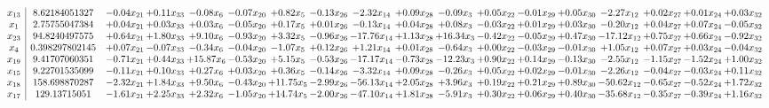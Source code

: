 \documentclass[9pt]{article}
\begin{document}
 \[\begin{array}{c| c c@{\hskip 2pt} c@{\hskip 2pt} c@{\hskip 2pt} c@{\hskip 2pt} c@{\hskip 2pt} c@{\hskip 2pt} c@{\hskip 2pt} c@{\hskip 2pt} c@{\hskip 2pt} c@{\hskip 2pt} c@{\hskip 2pt} c@{\hskip 2pt} c@{\hskip 2pt} c@{\hskip 2pt} c@{\hskip 2pt} c@{\hskip 2pt} }
 x_{13}   &  8.62184051327 & -0.04 x_{21} & +  0.11 x_{33} & -0.08 x_{6} & -0.07 x_{20} & +  0.82 x_{5} & -0.13 x_{26} & -2.32 x_{14} & +  0.09 x_{28} & -0.09 x_{3} & +  0.05 x_{22} & -0.01 x_{29} & +  0.05 x_{30} & -2.27 x_{12} & +  0.02 x_{27} & +  0.01 x_{24} & +  0.03 x_{32}\\
 x_{1}   &  2.75755047384 & +  0.04 x_{21} & +  0.03 x_{33} & +  0.03 x_{6} & -0.05 x_{20} & +  0.17 x_{5} & +  0.01 x_{26} & -0.13 x_{14} & +  0.04 x_{28} & +  0.08 x_{3} & -0.03 x_{22} & +  0.01 x_{29} & +  0.03 x_{30} & -0.20 x_{12} & +  0.04 x_{27} & +  0.07 x_{24} & -0.05 x_{32}\\
 x_{23}   &  94.8240497575 & +  0.64 x_{21} & +  1.80 x_{33} & +  9.10 x_{6} & -0.93 x_{20} & +  3.32 x_{5} & -0.96 x_{26} & -17.76 x_{14} & +  1.13 x_{28} & + 16.34 x_{3} & -0.42 x_{22} & -0.05 x_{29} & +  0.47 x_{30} & -17.12 x_{12} & +  0.75 x_{27} & +  0.66 x_{24} & -0.92 x_{32}\\
 x_{4}   &  0.398297802145 & +  0.07 x_{21} & -0.07 x_{33} & -0.34 x_{6} & -0.04 x_{20} & -1.07 x_{5} & +  0.12 x_{26} & +  1.21 x_{14} & +  0.01 x_{28} & -0.64 x_{3} & +  0.00 x_{22} & -0.03 x_{29} & -0.01 x_{30} & +  1.05 x_{12} & +  0.07 x_{27} & +  0.03 x_{24} & -0.04 x_{32}\\
 x_{19}   &  9.41707060351 & -0.71 x_{21} & +  0.44 x_{33} & + 15.87 x_{6} & -0.53 x_{20} & +  5.15 x_{5} & -0.53 x_{26} & -17.17 x_{14} & -0.73 x_{28} & -12.23 x_{3} & +  0.90 x_{22} & +  0.14 x_{29} & -0.13 x_{30} & -2.55 x_{12} & -1.15 x_{27} & -1.52 x_{24} & +  1.00 x_{32}\\
 x_{15}   &  9.22701535099 & -0.11 x_{21} & +  0.10 x_{33} & +  0.27 x_{6} & +  0.03 x_{20} & +  0.36 x_{5} & -0.14 x_{26} & -3.32 x_{14} & +  0.09 x_{28} & -0.26 x_{3} & +  0.05 x_{22} & +  0.02 x_{29} & -0.01 x_{30} & -2.26 x_{12} & -0.04 x_{27} & -0.03 x_{24} & +  0.11 x_{32}\\
 x_{18}   &  158.698870287 & -2.32 x_{21} & +  1.84 x_{33} & +  9.50 x_{6} & -0.43 x_{20} & + 11.75 x_{5} & -2.99 x_{26} & -56.13 x_{14} & +  2.05 x_{28} & +  3.96 x_{3} & +  0.19 x_{22} & +  0.21 x_{29} & +  0.89 x_{30} & -50.62 x_{12} & -0.65 x_{27} & -0.52 x_{24} & +  1.72 x_{32}\\
 x_{17}   &  129.13715051 & -1.61 x_{21} & +  2.25 x_{33} & +  2.32 x_{6} & -1.05 x_{20} & + 14.74 x_{5} & -2.00 x_{26} & -47.10 x_{14} & +  1.81 x_{28} & -5.91 x_{3} & +  0.30 x_{22} & +  0.06 x_{29} & +  0.40 x_{30} & -35.68 x_{12} & -0.35 x_{27} & -0.39 x_{24} & +  1.16 x_{32}\\

\end{array}\]
\end{document}
